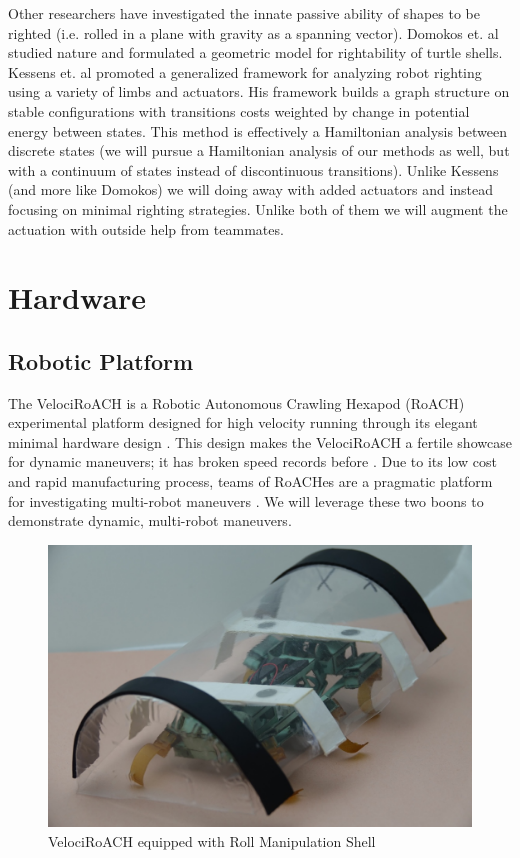 \documentclass[letterpaper, 10 pt, conference]{ieeeconf}
\begin{document}
Other researchers have investigated the innate passive ability of shapes to be righted (i.e. rolled in a plane with gravity as a spanning vector).
Domokos et. al \cite{domokos2008geometry} studied nature and formulated a geometric model for rightability of turtle shells.
Kessens et. al \cite{kessens2012framework,kessens2014metric} promoted a generalized framework for analyzing robot righting using a variety of limbs and actuators.
His framework builds a graph structure on stable configurations with transitions costs weighted by change in potential energy between states.
This method is effectively a Hamiltonian analysis between discrete states (we will pursue a Hamiltonian analysis of our methods as well, but with a continuum of states instead of discontinuous transitions).
Unlike Kessens (and more like Domokos) we will doing away with added actuators and instead focusing on minimal righting strategies.
Unlike both of them we will augment the actuation with outside help from teammates.

\section{Hardware}

\subsection{Robotic Platform}
The VelociRoACH is a Robotic Autonomous Crawling Hexapod (RoACH) experimental platform designed for high velocity running through its elegant minimal hardware design \cite{haldaneVelociRoACHDesign}.
This design makes the VelociRoACH a fertile showcase for dynamic maneuvers; it has broken speed records before \cite{haldane2015running}.
Due to its low cost and rapid manufacturing process, teams of RoACHes are a pragmatic platform for investigating multi-robot maneuvers \cite{casarez2016step}.
We will leverage these two boons to demonstrate dynamic, multi-robot maneuvers.

\begin{figure}[ht]
  \centering
  \includegraphics[width=0.8\columnwidth]{ShellRoACH.jpg}
  \caption{\label{fig:ShellRoACH}VelociRoACH equipped with Roll Manipulation Shell}
\end{figure}
\end{document}
